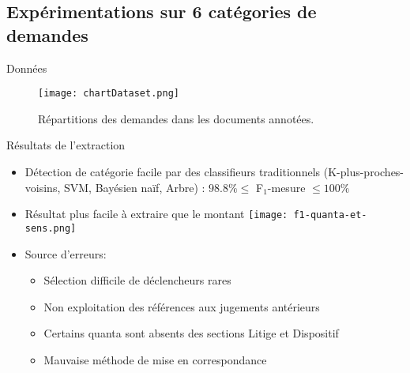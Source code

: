 \subsection{Expérimentations sur 6 catégories de demandes}
\begin{frame}{Données}
	\begin{figure}[!htb]
		\texttt{[image: chartDataset.png]}
		\caption{\scriptsize Répartitions des demandes dans les documents annotées.}\label{fig:quanta:hist-repartition-docs}
	\end{figure}	
\end{frame}


\begin{frame}[c]{Résultats de l'extraction}
	\begin{itemize} \scriptsize
		\item Détection de catégorie facile par des classifieurs traditionnels (K-plus-proches-voisins, SVM, Bayésien naïf, Arbre) : $98.8\% \leq$ F$_1$-mesure $\leq 100\%$
		\item Résultat plus facile à extraire que le montant
			\texttt{[image: f1-quanta-et-sens.png]}			
		\item Source d'erreurs:
		\begin{itemize} \scriptsize
			\item Sélection	difficile de déclencheurs rares
			\item Non exploitation des références aux jugements antérieurs
			\item Certains quanta sont absents des sections Litige et Dispositif
			\item Mauvaise méthode de mise en correspondance
		\end{itemize}
	\end{itemize}
\end{frame}
